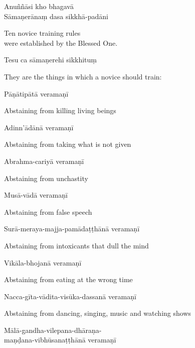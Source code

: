Anuññāsi kho bhagavā\\
Sāmaṇerānaṃ dasa sikkhā-padāni

\begin{english}
  Ten novice training rules\\
  were established by the Blessed One.
\end{english}

Tesu ca sāmaṇerehi sikkhituṃ

\begin{english}
  They are the things in which a novice should train:
\end{english}

Pāṇātipātā veramaṇī

\begin{english}
  Abstaining from killing living beings
\end{english}

Adinn'ādānā veramaṇī

\begin{english}
  Abstaining from taking what is not given
\end{english}

Abrahma-cariyā veramaṇī

\begin{english}
  Abstaining from unchastity
\end{english}

Musā-vādā veramaṇī

\begin{english}
  Abstaining from false speech
\end{english}

Surā-meraya-majja-pamādaṭṭhānā veramaṇī

\begin{english}
  Abstaining from intoxicants that dull the mind
\end{english}

Vikāla-bhojanā veramaṇī

\begin{english}
  Abstaining from eating at the wrong time
\end{english}

Nacca-gīta-vādita-visūka-dassanā veramaṇī

\begin{english}
  Abstaining from dancing, singing, music and watching shows
\end{english}

Mālā-gandha-vilepana-dhāraṇa-\\
\vin maṇḍana-vibhūsanaṭṭhānā veramaṇī

